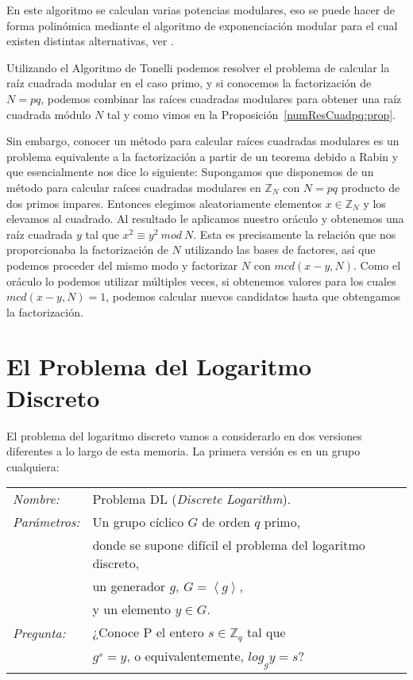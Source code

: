 En este algoritmo se calculan varias potencias modulares, eso se puede hacer de forma
polin\'omica mediante el algoritmo de exponenciaci\'on modular para el cual existen
distintas alternativas, ver \cite[Section 2.7.2]{Pardo}.

Utilizando el Algoritmo de Tonelli podemos resolver el problema de calcular
la ra\'iz cuadrada modular en el caso primo, y si conocemos la factorizaci\'on
de $N = pq$, podemos combinar las ra\'ices cuadradas modulares para obtener una
ra\'iz cuadrada m\'odulo $N$ tal y como vimos en la
Proposici\'on~\ref{numResCuadpq:prop}.

Sin embargo, conocer un m\'etodo para calcular ra\'ices cuadradas modulares es un problema
equivalente a la factorizaci\'on a partir de un teorema debido a Rabin y que esencialmente nos
dice lo siguiente: Supongamos que disponemos de un m\'etodo para calcular ra\'ices cuadradas
modulares en ${\mathbb Z}_N$ con $N = pq$ producto de dos primos impares. Entonces elegimos
aleatoriamente elementos $x \in {\mathbb Z}_N$ y los elevamos al cuadrado. Al
resultado le aplicamos nuestro or\'aculo y obtenemos una ra\'iz cuadrada $y$ tal que $x^2
\equiv y^2 ~mod~N$. Esta es precisamente la relaci\'on que nos proporcionaba
la factorizaci\'on de $N$ utilizando las bases de factores, as\'i que podemos proceder del
mismo modo y factorizar $N$ con $mcd(x-y,N)$. Como el or\'aculo lo podemos
utilizar m\'ultiples veces, si obtenemos valores para los cuales $mcd(x-y,N) = 1$, podemos
calcular nuevos candidatos hasta que obtengamos la factorizaci\'on.


\section{El Problema del Logaritmo Discreto}

El problema del logaritmo discreto vamos a considerarlo en dos versiones diferentes a lo largo de esta memoria. La primera versi\'on es en un grupo cualquiera:

\hfil

\begin{tabular}{|ll}
	\textit{Nombre:} & Problema DL (\textit{Discrete Logarithm}). \\
	\textit{Parámetros:} & Un grupo cíclico $G$ de orden $q$ primo, \\ & donde se supone difícil el problema del logaritmo discreto,  \\ & un generador $g$, $G=\left\langle g \right\rangle$,\\ & y un elemento $y\in G$. \\
	\textit{Pregunta:} & ¿Conoce P el entero $s\in \mathbb{Z}_q$ tal que \\ & $g^s = y$, o equivalentemente, $log_g y = s$? \\
\end{tabular}
\\

